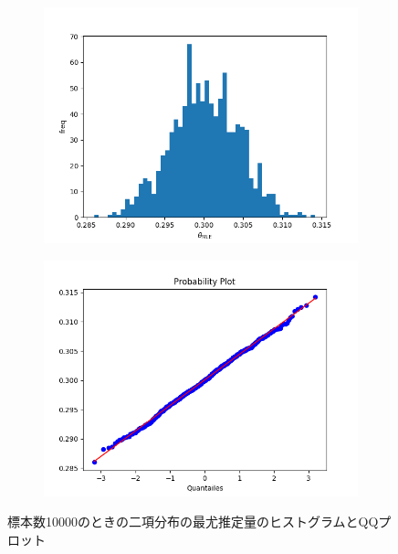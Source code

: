 \documentclass[class=jsarticle, crop=false, dvipdfmx, fleqn]{standalone}
\begin{document}
\begin{figure}
	\centering
    \begin{minipage}{0.45\linewidth}
        \begin{figure}[H]
            \centering
            \includegraphics[clip, width=\linewidth]{../figures/hist_n10000.png}
            \label{fig:hist_n10000}
        \end{figure}
    \end{minipage}
    \begin{minipage}{0.45\linewidth}
        \begin{figure}[H]
            \centering
            \includegraphics[clip, width=\linewidth]{../figures/qqplot_n10000.png}
            \label{fig:qqplot_n10000}
        \end{figure}
    \end{minipage}
    \caption{標本数10000のときの二項分布の最尤推定量のヒストグラムとQQプロット}
    \label{fig:n10000}
\end{figure}
\end{document}
